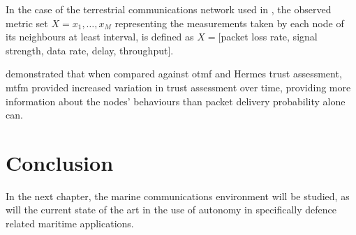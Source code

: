 In the case of the terrestrial communications network used in \cite{Guo11}, the observed metric set $X = {x_1,\dots,x_M}$ representing the measurements taken by each node of its neighbours at least interval, is defined as $X=[$packet loss rate, signal strength, data rate, delay, throughput$]$.

\citet{Guo11} demonstrated that when compared against \gls{otmf} and Hermes trust assessment, \gls{mtfm} provided increased variation in trust assessment over time, providing more information about the nodes' behaviours than packet delivery probability alone can.

\section{Conclusion}

In the next chapter, the marine communications environment will be studied, as will the current state of the art in the use of autonomy in specifically defence related maritime applications.
